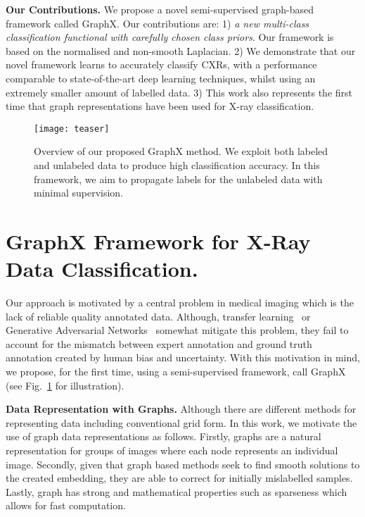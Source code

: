 \documentclass[runningheads]{llncs}
\begin{document}
\textbf{Our Contributions.} We propose a novel semi-supervised graph-based framework called GraphX. Our contributions are: 1) \textit{a new multi-class classification functional with carefully chosen class priors}. Our framework is based on the normalised and non-smooth  Laplacian.
2) We demonstrate that our novel framework learns to accurately classify CXRs, with a performance comparable to state-of-the-art deep learning techniques, whilst using an extremely smaller amount of labelled data.  3) This work also represents the first time that graph representations have been used for X-ray classification.



\begin{figure}[t!]
\centering
\texttt{[image: teaser]}
\caption{Overview of our proposed GraphX method. We exploit both labeled and unlabeled data to produce high classification accuracy. In this framework, we aim to propagate labels for the unlabeled data with minimal supervision.}
\label{fig::teaser}
\end{figure}


\section{GraphX Framework for X-Ray Data Classification.}


Our approach is motivated by a central problem in medical imaging which is the lack of reliable quality annotated data. Although, transfer learning~\cite{bar2015chest} or Generative Adversarial Networks~\cite{moradi2015machine} somewhat mitigate this problem, they fail to account for the mismatch between expert annotation and ground truth annotation created by human bias and uncertainty. With this motivation in mind, we propose, for the first time, using a semi-supervised framework, call GraphX (see  Fig.~\ref{fig::teaser} for illustration).



\textbf{Data Representation with Graphs.} Although there are different methods for representing  data including conventional grid form. In this work, we motivate the use of graph data representations as follows. Firstly, graphs are a natural representation for groups of images where each node represents an individual image. Secondly, given that graph based methods seek to find smooth solutions to the created embedding, they are able to correct for initially mislabelled samples. Lastly, graph has strong and mathematical properties such as sparseness which allows for fast computation.
\end{document}

